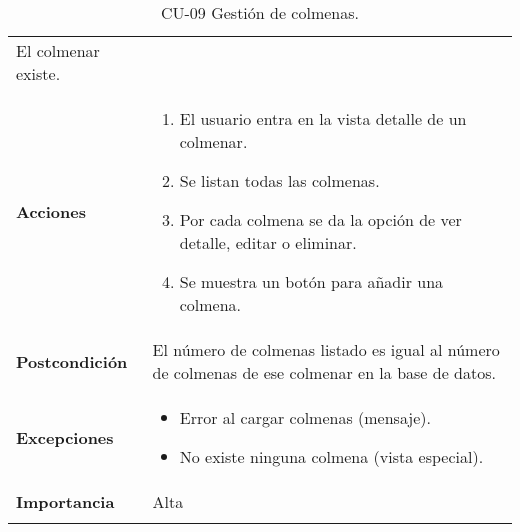 \begin{longtable}[H]{@{}ll@{}}
\begin{minipage}[t]{0.73\columnwidth}
El colmenar existe.\strut
\end{minipage}\tabularnewline
\begin{minipage}[t]{0.21\columnwidth}\raggedright\strut
\textbf{Acciones}\strut
\end{minipage} & \begin{minipage}[t]{0.73\columnwidth}\raggedright\strut
\begin{enumerate}
\def\labelenumi{\arabic{enumi}.}
\tightlist
\item
  El usuario entra en la vista detalle de un colmenar.
\item
  Se listan todas las colmenas.
\item
  Por cada colmena se da la opción de ver detalle, editar o eliminar.
\item
  Se muestra un botón para añadir una colmena.
\end{enumerate}\strut
\end{minipage}\tabularnewline
\begin{minipage}[t]{0.21\columnwidth}\raggedright\strut
\textbf{Postcondición}\strut
\end{minipage} & \begin{minipage}[t]{0.73\columnwidth}\raggedright\strut
El número de colmenas listado es igual al número de colmenas de ese
colmenar en la base de datos.\strut
\end{minipage}\tabularnewline
\begin{minipage}[t]{0.21\columnwidth}\raggedright\strut
\textbf{Excepciones}\strut
\end{minipage} & \begin{minipage}[t]{0.73\columnwidth}\raggedright\strut
\begin{itemize}
\tightlist
\item
  Error al cargar colmenas (mensaje).
\item
  No existe ninguna colmena (vista especial).
\end{itemize}\strut
\end{minipage}\tabularnewline
\begin{minipage}[t]{0.21\columnwidth}\raggedright\strut
\textbf{Importancia}\strut
\end{minipage} & \begin{minipage}[t]{0.73\columnwidth}\raggedright\strut
Alta\strut
\end{minipage}\tabularnewline
\bottomrule
\caption{CU-09 Gestión de colmenas.}
\end{longtable}

